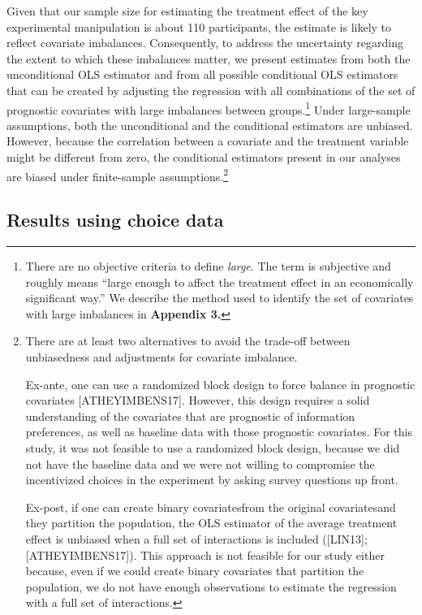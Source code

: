 \documentclass[12pt]{article}
\begin{document}
Given that our sample size for estimating the treatment effect of the key experimental manipulation is about 110 participants, the estimate is likely to reflect covariate imbalances. Consequently, to address the uncertainty regarding the extent to which these imbalances matter, we present estimates from both the unconditional OLS estimator and from all possible conditional OLS estimators that can be created by adjusting the regression with all combinations of the set of prognostic covariates with large imbalances between groups.\footnote{There are no objective criteria to define \emph{large}. The term is subjective and roughly means \enquote{large enough to affect the treatment effect in an economically significant way.} We describe the method used to identify the set of covariates with large imbalances in \textbf{Appendix 3.}} Under large-sample assumptions, both the unconditional and the conditional estimators are unbiased. However, because the correlation between a covariate and the treatment variable might be different from zero, the conditional estimators present in our analyses are biased under finite-sample assumptions.\footnote{There are at least two alternatives to avoid the trade-off between unbiasedness and adjustments for covariate imbalance.

Ex-ante, one can use a randomized block design to force balance in prognostic covariates [ATHEYIMBENS17]. However, this design requires a solid understanding of the covariates that are prognostic of information preferences, as well as baseline data with those prognostic covariates. For this study, it was not feasible to use a randomized block design, because we did not have the baseline data and we were not willing to compromise the incentivized choices in the experiment by asking survey questions up front.

Ex-post, if one can create binary covariates\textemdash from the original covariates\textemdash and they partition the population, the OLS estimator of the average treatment effect is unbiased when a full set of interactions is included ([LIN13]; [ATHEYIMBENS17]). This approach is not feasible for our study either because, even if we could create binary covariates that partition the population, we do not have enough observations to estimate the regression with a full set of interactions.
}

\subsection{Results using choice data}
\end{document}
